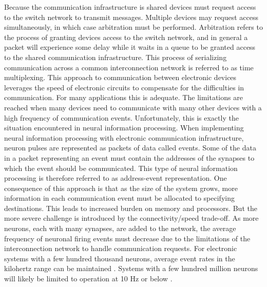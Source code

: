 \documentclass[twocolumn]{article}
\begin{document}
Because the communication infrastructure is shared devices must request access to the switch network to transmit messages. Multiple devices may request access simultaneously, in which case arbitration must be performed. Arbitration refers to the process of granting devices access to the switch network, and in general a packet will experience some delay while it waits in a queue to be granted access to the shared communication infrastructure. This process of serializing communication across a common interconnection network is referred to as time multiplexing. This approach to communication between electronic devices leverages the speed of electronic circuits to compensate for the difficulties in communication. For many applications this is adequate. The limitations are reached when many devices need to communicate with many other devices with a high frequency of communication events. Unfortunately, this is exactly the situation encountered in neural information processing. When implementing neural information processing with electronic communication infrastructure, neuron pulses are represented as packets of data called events. Some of the data in a packet representing an event must contain the addresses of the synapses to which the event should be communicated. This type of neural information processing is therefore referred to as address-event representation. One consequence of this approach is that as the size of the system grows, more information in each communication event must be allocated to specifying destinations. This leads to increased burden on memory and processors. But the more severe challenge is introduced by the connectivity/speed trade-off. As more neurons, each with many synapses, are added to the network, the average frequency of neuronal firing events must decrease due to the limitations of the interconnection network to handle communication requests. For electronic systems with a few hundred thousand neurons, average event rates in the kilohertz range can be maintained \cite{}. Systems with a few hundred million neurons will likely be limited to operation at 10 Hz or below \cite{}. 
\end{document}

